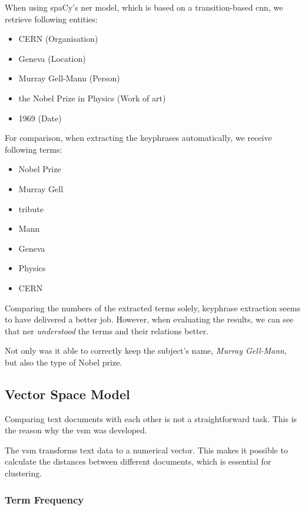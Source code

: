 When using spaCy's \gls{ner} model, which is based on a transition-based \gls{cnn}\cite{LampleBSKD16},
we retrieve following entities:

\begin{itemize}
    \item CERN (Organisation)
    \item Geneva (Location)
    \item Murray Gell-Mann (Person)
    \item the Nobel Prize in Physics (Work of art)
    \item 1969 (Date)
\end{itemize}

For comparison, when extracting the keyphrases automatically, we receive following terms:

\begin{itemize}
    \item Nobel Prize
    \item Murray Gell
    \item tribute
    \item Mann
    \item Geneva
    \item Physics
    \item CERN
\end{itemize}

Comparing the numbers of the extracted terms solely, keyphrase extraction seems to have delivered a better job.
However, when evaluating the results, we can see that \Gls{ner} \textit{understood} the terms and their
relations better.

Not only was it able to correctly keep the subject's name, \textit{Murray Gell-Mann}, but also the type of Nobel prize.

\subsection{Vector Space Model}
\label{subsec:3_vector_space_model}

Comparing text documents with each other is not a straightforward task.
This is the reason why the \gls{vsm} was developed.

The \Gls{vsm} transforms text data to a numerical vector.
This makes it possible to calculate the distances between different documents,
which is essential for clustering.

\subsubsection{Term Frequency}
\label{subsubsec:3_term_frequency}

